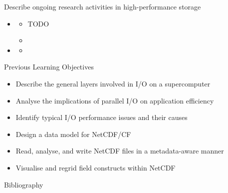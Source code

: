 \documentclass[compress,11pt,xcolor=svgnames,aspectratio=169]{beamer}
\begin{document}
\begin{frame}[t]{Describe ongoing research activities in high-performance storage}

\begin{itemize}

  \item
    \begin{itemize}
        \item TODO
        \item
    \end{itemize}
  \item
    \begin{itemize}
      \item
    \end{itemize}
\end{itemize}

\end{frame}

\begin{frame}[t]{Previous Learning Objectives}

\begin{itemize}

    \item Describe the general layers involved in I/O on a supercomputer
    \item Analyse the implications of parallel I/O on application efficiency
    \item Identify typical I/O performance issues and their causes
    \item Design a data model for NetCDF/CF
    \item Read, analyse, and write NetCDF files in a metadata-aware manner
    \item Visualise and regrid field constructs within NetCDF

\end{itemize}

\end{frame}

\begin{frame}[allowframebreaks]{Bibliography}

{

\tiny




}

\end{frame}

\acknowledgement
\end{document}
